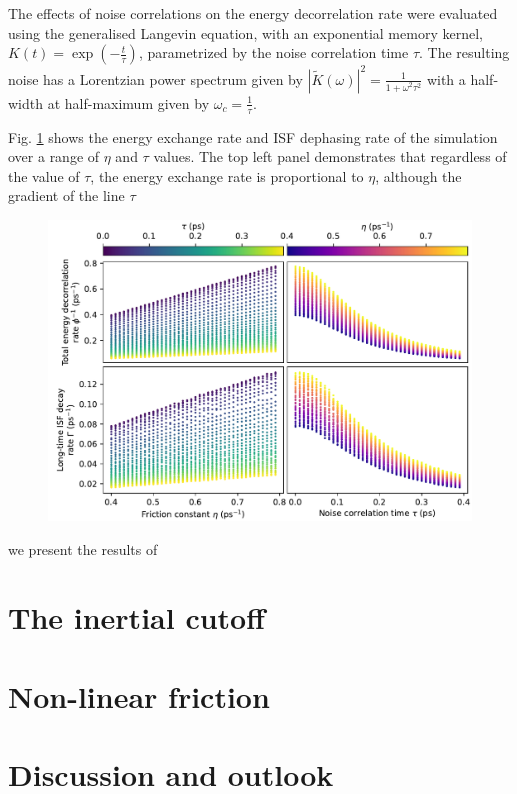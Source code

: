 \documentclass[7pt]{article}
\begin{document}
The effects of noise correlations on the energy decorrelation rate were evaluated using the generalised Langevin equation,
with an exponential memory kernel, $K(t)=\exp(-\frac{t}{\tau})$, parametrized by the noise correlation time $\tau$. The resulting noise has a Lorentzian power spectrum given by $\left|\tilde{K}(\omega)\right|^2=\frac{1}{1+\omega^2\tau^2}$ with a half-width at half-maximum given by $\omega_c = \frac{1}{\tau}$.

Fig. \ref{fig:eta_tau_ttf_gamma} shows the energy exchange rate and ISF dephasing rate of the simulation over a range of $\eta$ and $\tau$ values. The top left panel demonstrates that regardless of the value of $\tau$, the energy exchange rate is proportional to $\eta$, although the gradient of the line  $\tau$

\begin{figure}
	\centering
	\includegraphics[width=1.0\textwidth]{eta_tau_ttf_gamma}
	\caption{}
	\label{fig:eta_tau_ttf_gamma}
\end{figure}

 we present the results of  

\section*{The inertial cutoff}

\section*{Non-linear friction}

\section*{Discussion and outlook}
\end{document}

